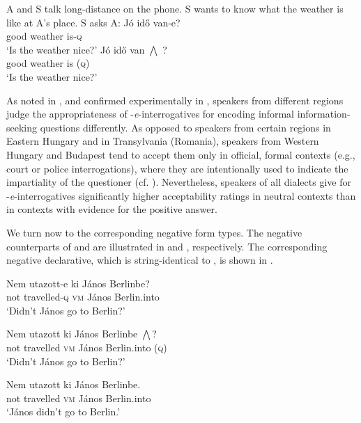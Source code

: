 \documentclass[output=paper,colorlinks,citecolor=brown]{langscibook}
\begin{document}
	
	\ea\label{ex:longdistance} A and S talk long-distance on the phone. S wants to know what the weather is like at A's place. S asks A:
	\ea
	\gll Jó idő van-e?\\
	good weather is-\textsc{q}\\
	\glt `Is the weather nice?'	
	\ex  \gll Jó idő van $\bigwedge$ ?\\
    good weather is (\textsc{q}) \\
	\glt `Is the weather nice?'
	\z
	\z
	
	
As noted in \citet{Gyuris2017}, and confirmed experimentally in \citet{gyuris+molnar+mady2020, gyuris+molnar+mady2021}, speakers from different regions judge  the appropriateness of -\textit{e}-{in\-ter\-ro\-ga\-tives} for encoding informal information-seeking questions differently. As opposed to speakers from certain regions in Eastern Hungary and in Transylvania (Romania), speakers from Western Hungary and Budapest tend to accept them only in official, formal contexts (e.g., court or police interrogations), where they are intentionally used to indicate the impartiality of the questioner (cf. \citealt{varga2021}). Nevertheless,  speakers of all dialects give  for \nobreakdash-\textit{e}-interrogatives significantly higher acceptability ratings  in neutral contexts than in  contexts with evidence for the positive answer. 
	
	We turn now to the corresponding negative form types. The negative  counterparts of  and  are illustrated in  and , respectively. The corresponding negative declarative, which  is string-identical to , is shown in .
	
	\ea\label{ex:nem-utazott-e}
	\gll Nem utazott-e	ki	János Berlinbe?\\
	not	travelled-\textsc{q} \textsc{vm} János Berlin.into\\
	\glt `Didn't János go to Berlin?'
	\z
	
	\ea\label{ex:nem-utazott?} 	
	\gll Nem utazott ki János {Berlinbe} {$\bigwedge$?}\\
	not	travelled	\textsc{vm} János 	Berlin.into (\textsc{q})\\ 
	\glt `Didn't János go to Berlin?'
	\z
	
	\ea\label{ex:nem-utazott} 	
	\gll Nem utazott ki János Berlinbe.\\
	not	travelled	\textsc{vm} János 	Berlin.into \\ 
	\glt `János didn't go to Berlin.'
	\z
	
\end{document}
